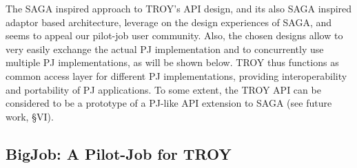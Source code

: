 \documentclass[conference,final]{IEEEtran}
\newcommand{\jhanote}[1]{ {\textcolor{red} { ***shantenu: #1 }}}
\newcommand{\alnote}[1]{ {\textcolor{blue} { ***andre: #1 }}}
\newcommand{\alnote}[1]{}
\newcommand{\jhanote}[1]{}
\newcommand{\upp}{\vspace*{-0.5em}}
\begin{document}

The SAGA inspired approach to TROY's API design, and its also SAGA
inspired adaptor based architecture, leverage on the design
experiences of SAGA, and seems to appeal our pilot-job user community.
Also, the chosen designs allow to very easily exchange the actual PJ
implementation and to concurrently use multiple PJ implementations, as
will be shown below.  TROY thus functions as common access layer for
different PJ implementations, providing interoperability and
portability of PJ applications.  To some extent, the TROY API can be
considered to be a prototype of a PJ-like API extension to SAGA (see
future work, \S{VI}).


\subsection{BigJob: A Pilot-Job for TROY\upp\upp}



\end{document}
